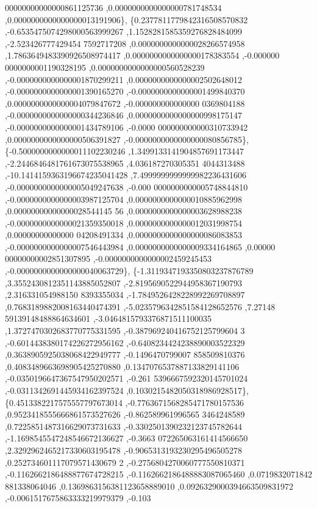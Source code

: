 \begin{DoxyCode}
      00000000000000861125736 ,0.0000000000000000781748534 ,0.0000000000000000013191906\},
\{0.2377811779842316508570832 ,-0.6535475074298000563999267 ,1.1528281585359276828484099 ,-2.523426777429454
      7592717208 ,0.0000000000000028266574958 ,1.7863649483390926508974417 ,0.0000000000000000178383554 ,-0.000000
      0000000001190328195 ,0.0000000000000000560528239 ,-0.0000000000000001870299211 ,0.0000000000000002502648012 
      ,-0.0000000000000001390165270 ,-0.0000000000000001499840370 ,0.0000000000000004079847672 ,-0.000000000000000
      0369804188 ,-0.0000000000000000344236846 ,0.0000000000000000998175147 ,-0.0000000000000001434789106 ,-0.0000
      000000000000310733942 ,0.0000000000000000506391827 ,-0.0000000000000000080856785\},
\{-0.5000000000000011102230246 ,1.3499133141904857691173447 ,-2.2446846481761673075538965 ,4.036187270305351
      4044313488 ,-10.1414159363196674235041428 ,7.4999999999999982236431606 ,-0.0000000000000005049247638 ,-0.000
      0000000000005748844810 ,-0.0000000000000003987125704 ,0.0000000000000010885962998 ,0.00000000000000028544145
      56 ,0.0000000000000003628988238 ,-0.0000000000000021359350018 ,0.0000000000000012031998754 ,0.00000000000000
      04208491334 ,0.0000000000000000086083853 ,-0.0000000000000007546443984 ,0.0000000000000009334164865 ,0.00000
      00000000002851307895 ,-0.0000000000000002459245453 ,-0.0000000000000000040063729\},
\{-1.3119347193350803237876789 ,3.3552430812351143885052807 ,-2.8195690522944958367190793 ,2.316331054988150
      8393355034 ,-1.7849526428228992269708897 ,0.7683189882008163440474391 ,-5.0235796342851584128652576 ,7.27148
      59139148488864634601 ,-3.0464815793376871511100035 ,1.3727470302683770775331595 ,-0.387969240416752125799604
      3 ,-0.6014438380174226272956162 ,-0.6408234424238890003522329 ,0.3638905925038068422949777 ,-0.1496470799007
      858509810376 ,0.4083489663698905425270880 ,0.1347076537887133829141106 ,-0.0350196647367547950202571 ,-0.261
      5396667592320145701024 ,-0.0311342691445934162397524 ,0.1030215482050318986928517\},
\{0.4513382217575557797673014 ,-0.7763671568285471780157536 ,0.9523418555666861573527626 ,-0.862589961996565
      3464248589 ,0.7225851487316629073731633 ,-0.3302501390232123745782644 ,-1.1698545547248546672136627 ,-0.3663
      072265063161414566650 ,2.3292962465217330603195478 ,-0.9065313193230295496505278 ,0.252734601117079571430679
      2 ,-0.2756804270060777550810371 ,-0.1162662186488877674728215 ,-0.1162662186488883087065460 ,0.0719832071842
      881338064046 ,0.1369863156381123658889010 ,0.0926329000394663509831972 ,-0.0061517675863333219979379 ,-0.103

\end{DoxyCode}
